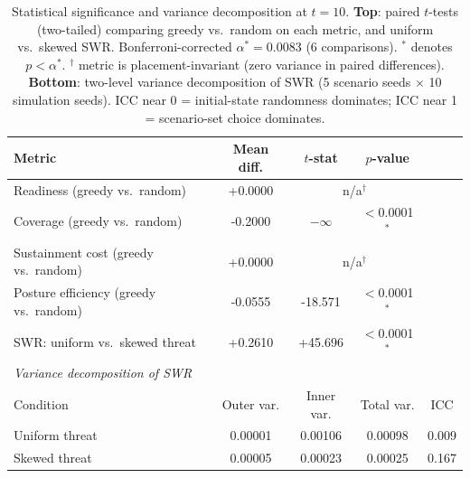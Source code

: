\begin{table}[htbp]
\centering
\caption{Statistical significance and variance decomposition at $t = 10$. \textbf{Top}: paired $t$-tests (two-tailed) comparing greedy vs.\ random on each metric, and uniform vs.\ skewed SWR. Bonferroni-corrected $\alpha^* = 0.0083$ (6 comparisons). $^{{*}}$ denotes $p < \alpha^*$. $^{{\dagger}}$ metric is placement-invariant (zero variance in paired differences). \textbf{Bottom}: two-level variance decomposition of SWR (5 scenario seeds $\times$ 10 simulation seeds). ICC near 0 = initial-state randomness dominates; ICC near 1 = scenario-set choice dominates.}
\label{tab:exp1_significance}
\begin{tabular}{lcccc}
\hline
Metric & Mean diff. & $t$-stat & $p$-value \\
\hline
        Readiness (greedy vs.\ random) & +0.0000 & \multicolumn{2}{c}{n/a$^{\dagger}$} \\
        Coverage (greedy vs.\ random) & -0.2000 & $-\infty$ & $<$0.0001$^{*}$ \\
        Sustainment cost (greedy vs.\ random) & +0.0000 & \multicolumn{2}{c}{n/a$^{\dagger}$} \\
        Posture efficiency (greedy vs.\ random) & -0.0555 & -18.571 & $<$0.0001$^{*}$ \\
        SWR: uniform vs.\ skewed threat & +0.2610 & +45.696 & $<$0.0001$^{*}$ \\
\hline
\multicolumn{5}{l}{\textit{Variance decomposition of SWR}} \\
\hline
Condition & Outer var. & Inner var. & Total var. & ICC \\
\hline
        Uniform threat & 0.00001 & 0.00106 & 0.00098 & 0.009 \\
        Skewed threat & 0.00005 & 0.00023 & 0.00025 & 0.167 \\
\hline
\end{tabular}
\end{table}